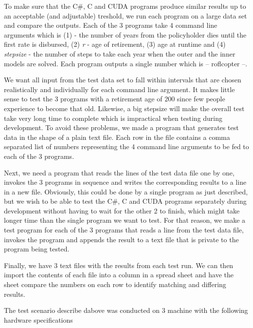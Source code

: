 To make sure that the C#, C and CUDA programs produce similar results up to an acceptable (and adjustable) treshold, we run each program on a large data set and compare the outputs. Each of the 3 programs take 4 command line arguments which is (1)  - the number of years from the policyholder dies until the first rate is disbursed, (2) \emph{r} -  age of retirement, (3)  age at runtime and (4) \emph{stepsize} - the number of steps to take each year when the outer and the inner models are solved. Each program outputs a single number which is  -- roflcopter --. 

We want all input from the test data set to fall within intervals that are chosen realistically and individually for each command line argument. It makes little sense to test the 3 programs with a retirement age of 200 since few people experience to become that old. Likewise, a big stepsize will make the overall test take very long time to complete which is impractical when testing during development. To avoid these problems, we made a program that generates test data in the shape of a plain text file. Each row in the file contains a comma separated list of numbers representing the 4 command line arguments to be fed to each of the 3 programs.

Next, we need a program that reads the lines of the test data file one by one, invokes the 3 programs in sequence and writes the corresponding results to a line in a new file. Obviously, this could be done by a single program as just described, but we wish to be able to test the C#, C and CUDA programs separately during development without having to wait for the other 2 to finish, which might take longer time than the single program we want to test. For that reason, we make a test program for each of the 3 programs that reads a line from the test data file, invokes the program and appends the result to a text file that is private to the program being tested. 

Finally, we have 3 text files with the results from each test run. We can then import the contents of each file into a column in a spread sheet and have the sheet compare the numbers on each row to identify matching and differing results.

The test scenario describe dabove was conducted on 3 machine with the following hardware specifications

